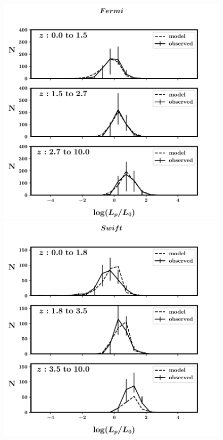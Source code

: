 \begin{figure}
\begin{center}
\includegraphics[scale=0.41]{BPL--Fermi--binned}
\includegraphics[scale=0.41]{BPL--Swift--binned}

\end{center}
\end{figure}
